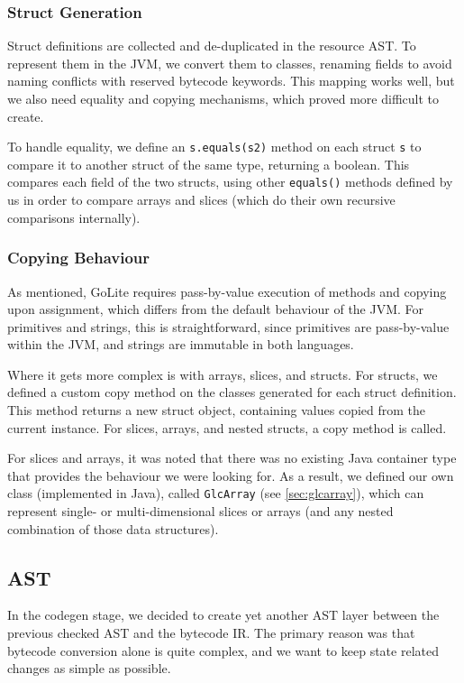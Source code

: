 \documentclass[11pt]{article}
\begin{document}
\subsubsection{Struct Generation}

Struct definitions are collected and de-duplicated in the resource AST.
To represent them in the JVM, we convert them to classes, renaming fields
to avoid naming conflicts with reserved bytecode keywords. This mapping
works well, but we also need equality and copying mechanisms, which proved
more difficult to create.

To handle equality, we define an \texttt{s.equals(s2)} method on each struct
\texttt{s} to compare it to another struct of the same type, returning a boolean.
This compares each field of the two structs, using other \texttt{equals()} methods
defined by us in order to compare arrays and slices (which do their own recursive
comparisons internally).

\subsubsection{Copying Behaviour}

As mentioned, GoLite requires pass-by-value execution of methods and copying upon
assignment, which differs from the default behaviour of the JVM. For primitives and
strings, this is straightforward, since primitives are pass-by-value within the JVM,
and strings are immutable in both languages.

Where it gets more complex is with arrays, slices, and structs. For structs, we defined
a custom copy method on the classes generated for each struct definition. This method
returns a new struct object, containing values copied from the current instance. For
slices, arrays, and nested structs, a copy method is called.

For slices and arrays, it was noted that there was no existing Java container type
that provides the behaviour we were looking for. As a result, we defined our own
class (implemented in Java), called \texttt{GlcArray} (see \ref{sec:glcarray}), which can represent single-
or multi-dimensional slices or arrays (and any nested combination of those data structures).

\subsection{AST}
\label{sec:resource-ast}

In the codegen stage, we decided to create yet another AST layer between the previous checked AST and the bytecode IR. The primary reason was that bytecode conversion alone is quite complex, and we want to keep state related changes as simple as possible.
\end{document}
